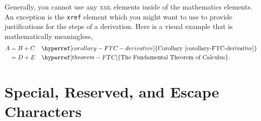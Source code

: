\documentclass[10pt,]{article}
\newcommand{\initialism}[1]{\textsc{\MakeLowercase{#1}}}
\theoremstyle{plain}
\theoremstyle{definition}
\theoremstyle{definition}
\theoremstyle{definition}
\theoremstyle{definition}
\theoremstyle{definition}
\theoremstyle{definition}
\numberwithin{equation}{section}
\begin{document}
%
\par
\hypertarget{p-196}{}%
Generally, you cannot use any \initialism{XML} elements inside of the mathematics elements.  An exception is the \lstinline?xref? element which you might want to use to provide justifications for the steps of a derivation.  Here is a visual example that is mathematically meaningless,%
\begin{align*}
A&=B+C&&\hyperref[corollary-FTC-derivative]{\text{Corollary~\ref{corollary-FTC-derivative}}}\\
&=D+E&&\hyperref[theorem-FTC]{\text{The Fundamental Theorem of Calculus}}\text{.}
\end{align*}
%
\typeout{************************************************}
\typeout{************************************************}
\section[{Special, Reserved, and Escape Characters}]{Special, Reserved, and Escape Characters}\label{section-8}
\typeout{************************************************}
\typeout{************************************************}
\end{document}
